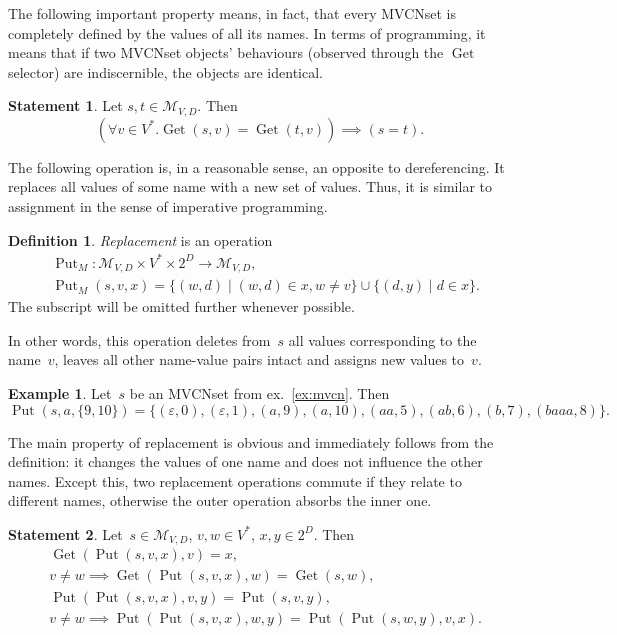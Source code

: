 \documentclass{article}
\theoremstyle{definition}
\newtheorem{Df}{Definition}
\newtheorem{St}{Statement}
\newtheorem{Ex}{Example}
\newcommand{\setcharmvcn}{M}
\newcommand{\setsymbol}[3]{\mathcal{#1}_{#2,#3}}
\newcommand{\setmvcn}[2]{\setsymbol{\setcharmvcn}{#1}{#2}}
\newcommand{\deref}{\operatorname{Get}}
\newcommand{\putval}{\operatorname{Put}}
\begin{document}
The following important property means, in fact, that every MVCNset is completely
defined by the values of all its names.  In terms of programming, it means that
if two MVCNset objects' behaviours (observed through the $\deref$ selector) are
indiscernible, the objects are identical.
\begin{St}\label{st:mvcn-deref-equality}
Let $s, t \in \setmvcn{V}{D}$. Then
\[
  (\forall v\in V^\ast . \deref(s,v) = \deref(t,v)) \implies (s = t) .
\]
\end{St}

The following operation is, in a reasonable sense, an opposite to
dereferencing.  It replaces all values of some name with a new set of values.
Thus, it is similar to assignment in the sense of imperative programming.
\begin{Df}\label{df:mvcn-replace}
\emph{Replacement} is an operation
\begin{eqnarray*}
 & \putval_\setcharmvcn :
    \setmvcn{V}{D} \times V^\ast \times 2^D \to \setmvcn{V}{D}, \\
 & \putval_\setcharmvcn(s, v, x) =
      \{ (w, d) \mid (w, d) \in x, w \neq v \} \cup
      \{ (d, y) \mid d \in x \} .
\end{eqnarray*}
The subscript will be omitted further whenever possible.
\end{Df}
In other words, this operation deletes from~$s$ all values corresponding to
the name~$v$, leaves all other name-value pairs intact and assigns new values
to~$v$.

\begin{Ex}\label{ex:mvcn-replace}
Let~$s$ be an MVCNset from ex.~\ref{ex:mvcn}. Then
\[
  \putval(s, a, \{ 9, 10 \}) = \{
    (\varepsilon, 0),
    (\varepsilon, 1),
    (a,           9),
    (a,           10),
    (aa,          5),
    (ab,          6),
    (b,           7),
    (baaa,        8)
  \} .
\]
\end{Ex}

The main property of replacement is obvious and immediately follows from the
definition: it changes the values of one name and does not influence the other
names. Except this, two replacement operations commute if they
relate to different names, otherwise the outer operation absorbs the inner one.
\begin{St}\label{st:mvcn-replace-deref}
Let~$s \in \setmvcn{V}{D}$, $v, w \in V^\ast$, $x, y \in 2^D$. Then
\begin{eqnarray*}
  & \deref(\putval(s, v, x), v) = x , \\
  & v \neq w \implies \deref(\putval(s, v, x), w) = \deref(s, w) , \\
  & \putval(\putval(s, v, x), v, y) = \putval(s, v, y) , \\
  & v \neq w \implies \putval(\putval(s, v, x), w, y) = \putval(\putval(s, w, y), v, x) .
\end{eqnarray*}
\end{St}
\end{document}
